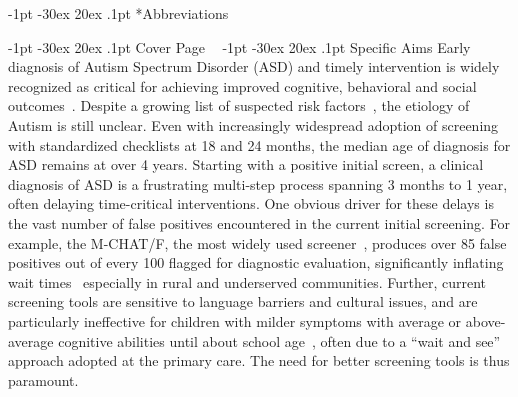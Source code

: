 \documentclass[onecolumn, compsoc,11pt]{IEEEtran}
\makeatletter
\renewcommand\section{\@startsection {section}{1}{\z@}%
                                   {-1pt \@plus -30ex \@minus 20ex}%
                                   {.1pt}%
                                   {\large\bfseries\scshape}}
\makeatother
\begin{document}


\vspace{20pt}


\section*{Abbreviations}

\section{Cover Page}
\clearpage
$\phantom{x}$
\vspace{-35pt}  
\section{Specific Aims}
Early diagnosis of Autism Spectrum Disorder (ASD) and  timely  intervention is widely recognized as critical for achieving improved cognitive, behavioral and social outcomes~\cite{hyman2020identification}.
Despite  a growing list of suspected risk factors~\cite{kalb2012determinants,bisgaier2011access,fenikile2015barriers,pmid27565363}, the etiology of Autism is still unclear. Even with increasingly widespread adoption of screening with standardized checklists at 18 and 24 months, the median age of diagnosis for ASD remains at over 4 years.  Starting with a positive initial screen, a clinical diagnosis of ASD is  a  frustrating multi-step process spanning 3 months to 1 year, often delaying  time-critical interventions. One obvious driver for these delays  is the vast number of false positives encountered in the current initial  screening. For example, the  M-CHAT/F, the most widely used  screener~\cite{robins2014validation,hyman2020identification},  produces    over 85 false positives out of every 100   flagged for  diagnostic evaluation, significantly inflating wait times~\cite{pmid27565363} especially in rural and underserved communities.
Further, current  screening tools are sensitive to language barriers and cultural issues, and are  particularly ineffective for children with milder symptoms  with average or above-average cognitive abilities until about school age~\cite{jashar2016cognitive,hyman2020identification}, often due to a ``wait and see'' approach adopted at the primary care. The need for better screening tools is thus paramount.
\end{document}
